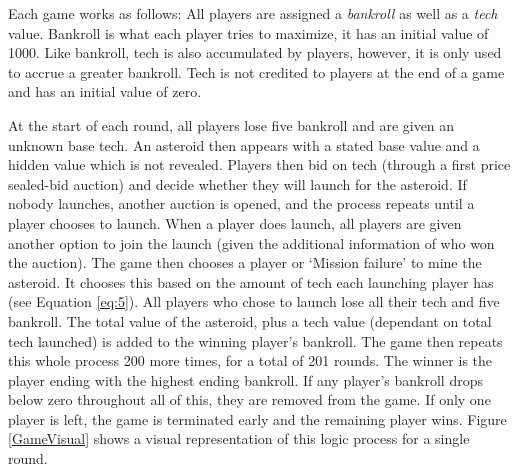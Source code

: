 \documentclass[11pt, twoside]{article}
\begin{document}
Each game works as follows: All players are assigned a \textit{bankroll} as well as a \textit{tech} value. Bankroll is what each player tries to maximize, it has an initial value of 1000. Like bankroll, tech is also accumulated by players, however, it is only used to accrue a greater bankroll. Tech is not credited to players at the end of a game and has an initial value of zero.

At the start of each round, all players lose five bankroll and are given an unknown base tech. An asteroid then appears with a stated base value and a hidden value which is not revealed. Players then bid on tech (through a first price sealed-bid auction) and decide whether they will launch for the asteroid. If nobody launches, another auction is opened, and the process repeats until a player chooses to launch. When a player does launch, all players are given another option to join the launch (given the additional information of who won the auction). The game then chooses a player or ‘Mission failure’ to mine the asteroid. It chooses this based on the amount of tech each launching player has (see Equation \ref{eq:5}). All players who chose to launch lose all their tech and five bankroll. The total value of the asteroid, plus a tech value (dependant on total tech launched) is added to the winning player’s bankroll. The game then repeats this whole process 200 more times, for a total of 201 rounds. The winner is the player ending with the highest ending bankroll. If any player's bankroll drops below zero throughout all of this, they are removed from the game. If only one player is left, the game is terminated early and the remaining player wins. Figure \ref{GameVisual} shows a visual representation of this logic process for a single round.
\end{document}
